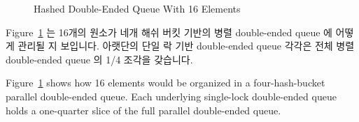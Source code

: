 \begin{figure}[tb]
\centering
{}
\caption{Hashed Double-Ended Queue With 16 Elements}
\label{fig:SMPdesign:Hashed Double-Ended Queue With 16 Elements}
\end{figure}

Figure~\ref{fig:SMPdesign:Hashed Double-Ended Queue With 16 Elements}
는 16개의 원소가 네개 해쉬 버킷 기반의 병렬 double-ended queue 에 어떻게 관리될
지 보입니다.
아랫단의 단일 락 기반 double-ended queue 각각은 전체 병렬 double-ended queue 의
1/4 조각을 갖습니다.

\iffalse

Figure~\ref{fig:SMPdesign:Hashed Double-Ended Queue With 16 Elements}
shows how 16 elements would be organized in a four-hash-bucket
parallel double-ended queue.
Each underlying single-lock double-ended queue holds a one-quarter
slice of the full parallel double-ended queue.


